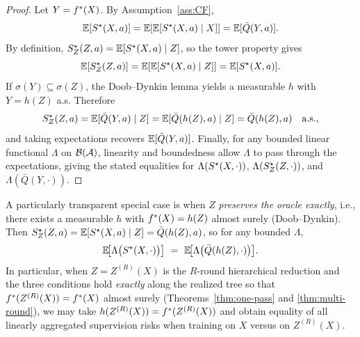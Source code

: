 \begin{proof}
Let $Y=f^{\ast}(X)$. By Assumption~\ref{ass:CF},
\[
\mathbb{E}[S^\star(X,a)]=\mathbb{E}[\mathbb{E}[S^\star(X,a)\mid X]]=\mathbb{E}[\bar Q(Y,a)].
\]
By definition, $S^\star_Z(Z,a)=\mathbb{E}[S^\star(X,a)\mid Z]$, so the tower property gives
\[
\mathbb{E}[S^\star_Z(Z,a)]=\mathbb{E}[\mathbb{E}[S^\star(X,a)\mid Z]]=\mathbb{E}[S^\star(X,a)].
\]
If $\sigma(Y)\subseteq\sigma(Z)$, the Doob--Dynkin lemma yields a measurable $h$ with $Y=h(Z)$ a.s. Therefore
\[
S^\star_Z(Z,a)=\mathbb{E}[\bar Q(Y,a)\mid Z]=\mathbb{E}[\bar Q(h(Z),a)\mid Z]=\bar Q(h(Z),a)\quad\text{a.s.},
\]
and taking expectations recovers $\mathbb{E}[\bar Q(Y,a)]$. Finally, for any bounded linear functional $\Lambda$ on $\mathcal{B}(\mathcal{A})$, linearity and boundedness allow $\Lambda$ to pass through the expectations, giving the stated equalities for $\Lambda(S^\star(X,\cdot))$, $\Lambda(S^\star_Z(Z,\cdot))$, and $\Lambda(\bar Q(Y,\cdot))$.
\end{proof}

A particularly transparent special case is when $Z$ \emph{preserves the oracle exactly}, i.e., there exists a measurable $h$ with $f^{\ast}(X)=h(Z)$ almost surely (Doob–Dynkin). Then
$S^\star_Z(Z,a)=\mathbb{E}[S^\star(X,a)\mid Z]=\bar Q(h(Z),a)$, so for any bounded $\Lambda$,
\[
\E\!\big[\Lambda\big(\sstar(X,\cdot)\big)\big]\ =\ \E\!\big[\Lambda\big(\bar Q(h(Z),\cdot)\big)\big].
\]
In particular, when $Z=Z^{(R)}(X)$ is the $R$-round hierarchical reduction and the three conditions hold \emph{exactly} along the realized tree so that $f^{\ast}(Z^{(R)}(X))=f^{\ast}(X)$ almost surely (Theorems~\ref{thm:one-pass} and \ref{thm:multi-round}), we may take $h(Z^{(R)}(X))=f^{\ast}(Z^{(R)}(X))$ and obtain equality of all linearly aggregated supervision risks when training on $X$ versus on $Z^{(R)}(X)$.





